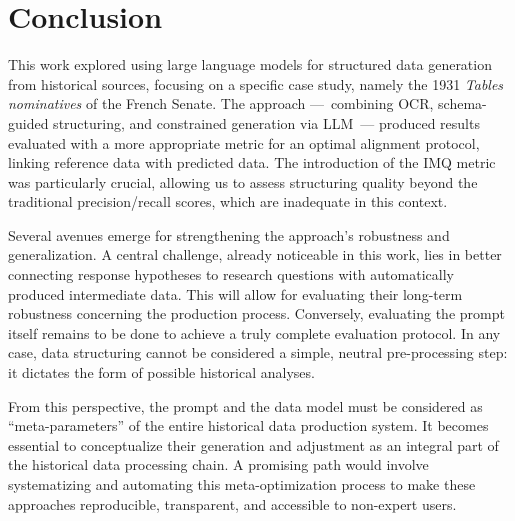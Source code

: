 \section{Conclusion}
This work explored using large language models for structured data generation from historical sources, focusing on a specific case study, namely the 1931 \textit{Tables nominatives} of the French Senate. The approach ---~combining OCR, schema-guided structuring, and constrained generation via LLM~--- produced results evaluated with a more appropriate metric for an optimal alignment protocol, linking reference data with predicted data. The introduction of the IMQ metric was particularly crucial, allowing us to assess structuring quality beyond the traditional precision/recall scores, which are inadequate in this context.

Several avenues emerge for strengthening the approach's robustness and generalization. A central challenge, already noticeable in this work, lies in better connecting response hypotheses to research questions with automatically produced intermediate data. This will allow for evaluating their long-term robustness concerning the production process. Conversely, evaluating the prompt itself remains to be done to achieve a truly complete evaluation protocol. In any case, data structuring cannot be considered a simple, neutral pre-processing step: it dictates the form of possible historical analyses.

From this perspective, the prompt and the data model must be considered as ``meta-parameters'' of the entire historical data production system. It becomes essential to conceptualize their generation and adjustment as an integral part of the historical data processing chain. A promising path would involve systematizing and automating this meta-optimization process to make these approaches reproducible, transparent, and accessible to non-expert users.




